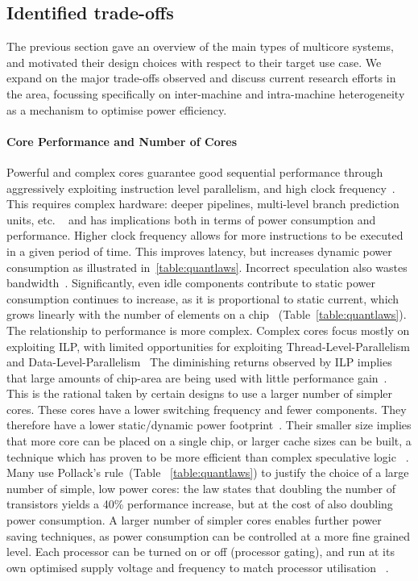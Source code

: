 \subsection{Identified trade-offs}

The previous section gave an overview of the main types of multicore systems, 
and motivated their design choices with respect to their target use case.
We expand on the major trade-offs observed and discuss current research efforts in the area, focussing specifically on inter-machine and intra-machine heterogeneity as a mechanism
to optimise power efficiency. 

\paragraph{Core Performance and Number of Cores}

Powerful and complex cores guarantee good sequential performance
through aggressively exploiting instruction level parallelism,
and high clock frequency~\cite{4563876}. This requires complex hardware:
deeper pipelines, multi-level branch prediction units, etc. ~\cite{hennessy2006comparchquantitative,Vajda:1414193} and has implications both in terms of power consumption
and performance. Higher clock frequency allows for more 
instructions to be executed in a given period of time. This
improves latency, but increases dynamic power consumption as illustrated
in~\ref{table:quantlaws}. Incorrect speculation also wastes bandwidth~\cite{rogers2009bandwidth}. 
Significantly, even idle components contribute to static power consumption continues to increase, as it is proportional
to static current, which grows linearly with the number of elements
on a chip~\cite{hennessy2006comparchquantitative} (Table~\ref{table:quantlaws}). The relationship to performance is more complex. Complex cores
focus mostly on exploiting ILP, with limited opportunities
for exploiting Thread-Level-Parallelism and Data-Level-Parallelism~\cite{borkar2011future} The diminishing returns observed by ILP implies that large amounts
of chip-area are being used with little performance gain~\cite{Borkar:2007:TCC:1278480.1278667}. This is 
the rational taken by certain designs to use a larger number
of simpler cores. These cores have a lower switching frequency
and fewer components. They therefore have a lower static/dynamic power
footprint~\cite{Borkar:2007:TCC:1278480.1278667}. Their smaller size implies that more core can be placed on 
a single chip, or larger cache sizes can be built, a technique
which has proven to be more efficient than complex speculative logic
~\cite{borkar2011future}.  Many use Pollack's rule~\cite{borkar2011future}(Table ~\ref{table:quantlaws})
to justify the choice of a large number of simple, low power cores: the 
law states that doubling the number of transistors yields
a 40\% performance increase, but at the cost of also doubling power consumption.
A larger number of simpler cores enables further power saving techniques, as power consumption can be controlled at a more fine grained level. 
Each processor can be turned on or off (processor gating), and run at its own
optimised supply voltage and frequency to match processor utilisation ~\cite{Borkar:2007:TCC:1278480.1278667}. 

